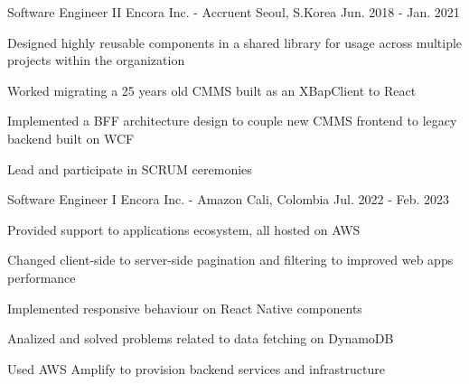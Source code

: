 

\begin{cventries}

  \cventry
    {Software Engineer II} %
    {Encora Inc. - Accruent} %
    {Seoul, S.Korea} %
    {Jun. 2018 - Jan. 2021} %
    {
      \begin{cvitems} %
        \item {Designed highly reusable components in a shared library for usage across multiple projects within the organization}
        \item {Worked migrating a 25 years old CMMS built as an XBapClient to React}
        \item {Implemented a BFF architecture design to couple new CMMS frontend to legacy backend built on WCF}
        \item {Lead and participate in SCRUM ceremonies}
      \end{cvitems}
    }

  \cventry
  {Software Engineer I} %
  {Encora Inc. - Amazon} %
  {Cali, Colombia} %
  {Jul. 2022 - Feb. 2023} %
  {
    \begin{cvitems} %
      \item {Provided support to applications ecosystem, all hosted on AWS}
      \item {Changed client-side to server-side pagination and filtering to improved web apps performance}
      \item {Implemented responsive behaviour on React Native components}
      \item {Analized and solved problems related to data fetching on DynamoDB}
      \item {Used AWS Amplify to provision backend services and infrastructure}
    \end{cvitems}
  }


\end{cventries}
